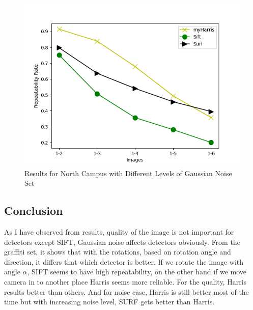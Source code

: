 \documentclass[12pt]{article}
\begin{document}
\begin{figure}[H]
    \centering
    \includegraphics{images/repeatabilities-var.png}
    \caption{Results for North Campus with Different Levels of Gaussian Noise Set}
\end{figure}

\subsection{Conclusion}
As I have observed from results, quality of the image is not important for detectors except SIFT, Gaussian noise affects detectors obviously. From the graffiti set, it shows that with the rotations, based on rotation angle and direction, it differs that which detector is better. If we rotate the image with angle $\alpha$, SIFT seems to have high repeatability, on the other hand if we move camera in to another place Harris seems more reliable. For the quality, Harris results better than others. And for noise case, Harris is still better most of the time but with increasing noise level, SURF gets better than Harris.
\end{document}

